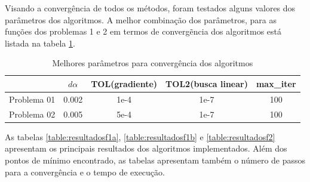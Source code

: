\documentclass[10pt, a4paper]{article}
\begin{document}
Visando a converg\^encia de todos os m\'etodos, foram testados alguns valores dos par\^ametros dos algoritmos. A melhor combina\c c\~ao dos par\^ametros, para as fun\c c\~oes dos problemas 1 e 2 em termos de converg\~encia dos algoritmos est\'a listada na tabela \ref{table:params}.
\begin{table}[H]
      \small
      \centering
      \caption{Melhores par\^ametros para converg\^encia dos algoritmos}
      \begin{tabular}{c|c|c|c|c}
                        & $d\alpha$ & TOL(gradiente) & TOL2(busca linear) & max\_iter \\
            \hline
            Problema 01 & 0.002 & 1e-4 & 1e-7 & 100 \\
            Problema 02 & 0.005 & 5e-4 & 1e-7 & 100 \\
      \end{tabular}
      \label{table:params}
\end{table}

As tabelas \ref{table:resultadosf1a}, \ref{table:resultadosf1b} e \ref{table:resultadosf2} apresentam os principais resultados dos algoritmos implementados. Al\'em dos pontos de m\'inimo encontrado, as tabelas apresentam tamb\'em o n\'umero de passos para a converg\^encia e o tempo de execu\c c\~ao.
\end{document}
